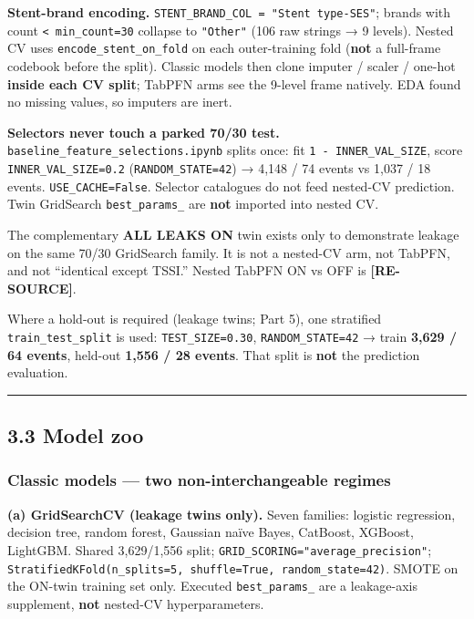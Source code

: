 \documentclass[
]{article}
\begin{document}
\textbf{Stent-brand encoding.}
\texttt{STENT\_BRAND\_COL\ =\ "Stent\ type-SES"}; brands with count
\texttt{\textless{}\ min\_count=30} collapse to \texttt{"Other"} (106
raw strings → 9 levels). Nested CV uses \texttt{encode\_stent\_on\_fold}
on each outer-training fold (\textbf{not} a full-frame codebook before
the split). Classic models then clone imputer / scaler / one-hot
\textbf{inside each CV split}; TabPFN arms see the 9-level frame
natively. EDA found no missing values, so imputers are inert.

\textbf{Selectors never touch a parked 70/30 test.}
\texttt{baseline\_feature\_selections.ipynb} splits once: fit
\texttt{1\ -\ INNER\_VAL\_SIZE}, score \texttt{INNER\_VAL\_SIZE=0.2}
(\texttt{RANDOM\_STATE=42}) → 4,148 / 74 events vs 1,037 / 18 events.
\texttt{USE\_CACHE=False}. Selector catalogues do not feed nested-CV
prediction. Twin GridSearch \texttt{best\_params\_} are \textbf{not}
imported into nested CV.

The complementary \textbf{ALL LEAKS ON} twin exists only to demonstrate
leakage on the same 70/30 GridSearch family. It is not a nested-CV arm,
not TabPFN, and not ``identical except TSSI.'' Nested TabPFN ON vs OFF
is \textbf{{[}RE-SOURCE{]}}.

Where a hold-out is required (leakage twins; Part 5), one stratified
\texttt{train\_test\_split} is used: \texttt{TEST\_SIZE=0.30},
\texttt{RANDOM\_STATE=42} → train \textbf{3,629 / 64 events}, held-out
\textbf{1,556 / 28 events}. That split is \textbf{not} the prediction
evaluation.

\begin{center}\rule{0.5\linewidth}{0.5pt}\end{center}

\subsection{3.3 Model zoo}\label{model-zoo}

\subsubsection{Classic models --- two non-interchangeable
regimes}\label{classic-models-two-non-interchangeable-regimes}

\textbf{(a) GridSearchCV (leakage twins only).} Seven families: logistic
regression, decision tree, random forest, Gaussian naïve Bayes,
CatBoost, XGBoost, LightGBM. Shared 3,629/1,556 split;
\texttt{GRID\_SCORING="average\_precision"};
\texttt{StratifiedKFold(n\_splits=5,\ shuffle=True,\ random\_state=42)}.
SMOTE on the ON-twin training set only. Executed \texttt{best\_params\_}
are a leakage-axis supplement, \textbf{not} nested-CV hyperparameters.
\end{document}
